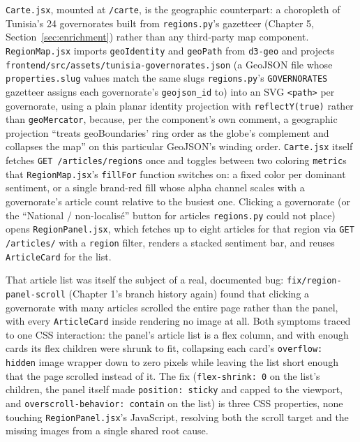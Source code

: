 \begin{sloppypar}
\texttt{Carte.jsx}, mounted at \texttt{/carte}, is the geographic counterpart: a choropleth of Tunisia's 24 governorates built from \texttt{regions.py}'s gazetteer (Chapter 5, Section~\ref{sec:enrichment}) rather than any third-party map component. \texttt{RegionMap.jsx} imports \texttt{geoIdentity} and \texttt{geoPath} from \texttt{d3-geo} and projects \texttt{frontend/\allowbreak src/\allowbreak assets/\allowbreak tunisia-governorates.json} (a GeoJSON file whose \texttt{properties.slug} values match the same slugs \texttt{regions.py}'s \texttt{GOVERNORATES} gazetteer assigns each governorate's \texttt{geojson\_id} to) into an SVG \texttt{<path>} per governorate, using a plain planar identity projection with \texttt{reflectY(true)} rather than \texttt{geoMercator}, because, per the component's own comment, a geographic projection ``treats geoBoundaries' ring order as the globe's complement and collapses the map'' on this particular GeoJSON's winding order. \texttt{Carte.jsx} itself fetches \texttt{GET /articles/\allowbreak regions} once and toggles between two coloring \texttt{metric}s that \texttt{RegionMap.jsx}'s \texttt{fillFor} function switches on: a fixed color per dominant sentiment, or a single brand-red fill whose alpha channel scales with a governorate's article count relative to the busiest one. Clicking a governorate (or the ``National / non-localisé'' button for articles \texttt{regions.py} could not place) opens \texttt{RegionPanel.jsx}, which fetches up to eight articles for that region via \texttt{GET /articles/} with a \texttt{region} filter, renders a stacked sentiment bar, and reuses \texttt{ArticleCard} for the list.
\end{sloppypar}

\begin{sloppypar}
That article list was itself the subject of a real, documented bug: \texttt{fix/\allowbreak region-panel-scroll} (Chapter 1's branch history again) found that clicking a governorate with many articles scrolled the entire page rather than the panel, with every \texttt{ArticleCard} inside rendering no image at all. Both symptoms traced to one CSS interaction: the panel's article list is a flex column, and with enough cards its flex children were shrunk to fit, collapsing each card's \texttt{overflow: hidden} image wrapper down to zero pixels while leaving the list short enough that the page scrolled instead of it. The fix (\texttt{flex-shrink: 0} on the list's children, the panel itself made \texttt{position: sticky} and capped to the viewport, and \texttt{overscroll-behavior: contain} on the list) is three CSS properties, none touching \texttt{RegionPanel.jsx}'s JavaScript, resolving both the scroll target and the missing images from a single shared root cause.
\end{sloppypar}

